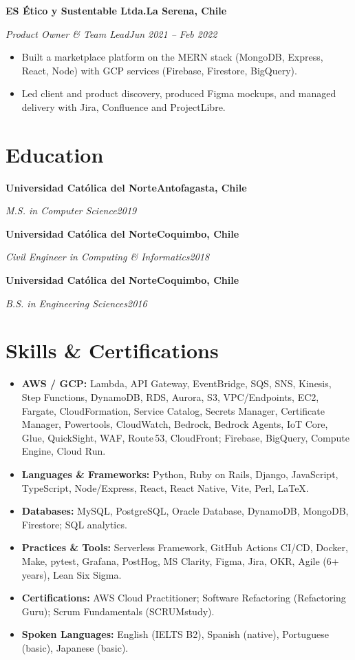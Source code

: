 \documentclass[11pt,a4paper]{article}
\newcommand{\entry}[4]{%
  \textbf{#1}\hfill\textbf{#2}\par
  \textit{#3}\hfill\textit{#4}\par\vspace{2pt}%
}
\begin{document}
\entry{ES \'Etico y Sustentable Ltda.}{La Serena, Chile}{Product Owner \& Team Lead}{Jun 2021 -- Feb 2022}
\begin{itemize}
  \item Built a marketplace platform on the MERN stack (MongoDB, Express, React, Node) with GCP
        services (Firebase, Firestore, BigQuery).
  \item Led client and product discovery, produced Figma mockups, and managed delivery with Jira,
        Confluence and ProjectLibre.
\end{itemize}

\section{Education}
\entry{Universidad Cat\'olica del Norte}{Antofagasta, Chile}{M.S. in Computer Science}{2019}
\vspace{3pt}
\entry{Universidad Cat\'olica del Norte}{Coquimbo, Chile}{Civil Engineer in Computing \& Informatics}{2018}
\vspace{3pt}
\entry{Universidad Cat\'olica del Norte}{Coquimbo, Chile}{B.S. in Engineering Sciences}{2016}

\section{Skills \& Certifications}
\begin{itemize}
  \item \textbf{AWS / GCP:} Lambda, API Gateway, EventBridge, SQS, SNS, Kinesis, Step Functions,
        DynamoDB, RDS, Aurora, S3, VPC/Endpoints, EC2, Fargate, CloudFormation, Service Catalog,
        Secrets Manager, Certificate Manager, Powertools, CloudWatch, Bedrock, Bedrock Agents,
        IoT Core, Glue, QuickSight, WAF, Route\,53, CloudFront; Firebase, BigQuery,
        Compute Engine, Cloud Run.
  \item \textbf{Languages \& Frameworks:} Python, Ruby on Rails, Django, JavaScript, TypeScript,
        Node/Express, React, React Native, Vite, Perl, \LaTeX.
  \item \textbf{Databases:} MySQL, PostgreSQL, Oracle Database, DynamoDB, MongoDB, Firestore; SQL analytics.
  \item \textbf{Practices \& Tools:} Serverless Framework, GitHub Actions CI/CD, Docker, Make, pytest,
        Grafana, PostHog, MS Clarity, Figma, Jira, OKR, Agile (6+ years), Lean Six Sigma.
  \item \textbf{Certifications:} AWS Cloud Practitioner; Software Refactoring (Refactoring Guru);
        Scrum Fundamentals (SCRUMstudy).
  \item \textbf{Spoken Languages:} English (IELTS B2), Spanish (native), Portuguese (basic), Japanese (basic).
\end{itemize}
\end{document}
